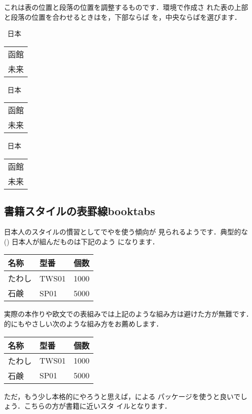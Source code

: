 これは表の位置と段落の位置を調整するものです．環境で作成さ
れた表の上部と段落の位置を合わせるときはを，下部ならば
を，中央ならばを選びます．

\begin{inout}
\newcommand{\testtab}[1][c]{~日本~
\begin{tabular}[#1]{|c|} \hline 
函館\\ 未来\\ \hline\end{tabular}}
\testtab \testtab[t] \testtab[b]
\end{inout}


\subsection{書籍スタイルの表罫線\zdash\textsf{booktabs}}

日本人のスタイルの慣習としてでやを使う傾向が
見られるようです．典型的な () 日本人が組んだものは下記のよう
になります．
\begin{inout}
\begin{tabular}{|l||l|l|}
 \hline
 名称   & 型番  & 個数 \\
 \hline\hline
 たわし & TWS01 & 1000 \\ \hline
 石鹸   & SP01  & 5000 \\ \hline
\end{tabular}
\end{inout}
実際の本作りや欧文での表組みでは上記のような組み方は避けた方が無難です．
的にもやさしい次のような組み方をお薦めします．
\begin{inout}
\begin{tabular}{lll}
 \hline
 名称   & 型番  & 個数 \\ \hline
 たわし & TWS01 & 1000 \\
 石鹸   & SP01  & 5000 \\ \hline
\end{tabular}
\end{inout}
ただ，もう少し本格的にやろうと思えば，による
 パッケージを使うと良いでしょう．こちらの方が書籍に近いスタ
イルとなります．

